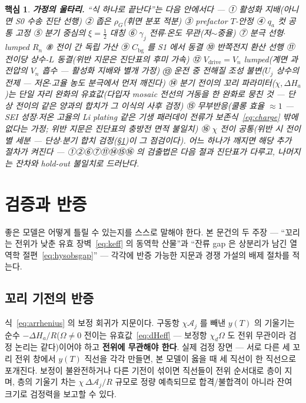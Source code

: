 \documentclass[11pt,a4paper]{article}
\newtheorem*{keybox}{핵심}
\newcommand{\drive}{\mathrm{drive}}
\newcommand{\bg}{\mathrm{bg}}
\begin{document}
\begin{keybox}
\textbf{가정의 울타리.} ``식 하나로 끝난다''는 다음 안에서다 — ① 활성화 지배(아니면 S0 수송 진단 선행)
② 좁은 $\rho_G$(휘면 분포 적분) ③ prefactor $T$-안정 ④ $q_a$ 컷 공통 고정 ⑤ 분기 중심의
$\xi=\tfrac12$ 대칭 ⑥ $\gamma_j$ 전류$\cdot$온도 무관(저$\sim$중율) ⑦ 분극 선형$\cdot$lumped
$R_n$ ⑧ 전이 간 독립 가산 ⑨ $C_\bg$ 를 S1 에서 동결 ⑩ 반쪽전지 환산 선행 ⑪ 전이당 상수-$L$
동결(위반 지문은 진단표의 후미 가속) ⑫ $V_\drive=V_n$ lumped(계면 과전압의 $V_n$ 흡수 — 활성화
지배와 별개 가정) ⑬ 운전 중 전해질 조성 불변($U_j$ 상수의 전제 — 저온$\cdot$고율 농도 분극에서 먼저
깨진다) ⑭ 분기 전이의 꼬리 파라미터($\chi,\Delta H_a$)는 단일 자리 완화의 \emph{유효값}(다입자
mosaic 전선의 거동을 한 완화로 뭉친 것 — 단상 전이의 같은 양과의 합치가 그 이식의 사후 검정)
⑮ 무부반응(쿨롱 효율 $\approx1$ — SEI 성장$\cdot$저온 고율의 Li plating 같은 기생 패러데이 전류가
보존식~\eqref{eq:charge} 밖에 없다는 가정; 위반 지문은 진단표의 충방전 면적 불일치)
⑯ $\chi$ 전이 공통(위반 시 전이별 세분 — 단상$\cdot$분기 합치 검정(\S\ref{sec:falsify})이 그
점검이다). 어느 하나가 깨지면 해당 추가 절차가 켜진다 — ①②⑥⑦⑪⑭⑮⑯ 의 검출법은 다음 절과
진단표가 다루고, 나머지는 잔차와 hold-out 불일치로 드러난다.
\end{keybox}

\section{검증과 반증}\label{sec:falsify}
좋은 모델은 어떻게 틀릴 수 있는지를 스스로 말해야 한다. 본 문건의 두 주장 — ``꼬리는 전위가 낮춘 유효 장벽~\eqref{eq:keff} 의 동역학 산물''과
``잔류 gap 은 상분리가 남긴 열역학 절편~\eqref{eq:hysobsgap}'' — 각각에 반증 가능한 지문과 경쟁
가설의 배제 절차를 적는다.

\subsection{꼬리 기전의 반증}
식~\eqref{eq:arrhenius} 의 보정 회귀가 지문이다. 구동항 $\chi\mathcal A_j$ 를 빼낸 $y(T)$ 의 기울기는
순수 $-\Delta H_a/R$($\Omega\ne0$ 전이는 유효값~\eqref{eq:dHeff} — 보정항 $\chi_d\Omega$ 도
전위 무관이라 검정 논리는 같다)이어야 하고 \textbf{전위에 무관해야 한다}. 실제 검정 장면 — 서로 다른 세 꼬리 전위
창에서 $y(T)$ 직선을 각각 만들면, 본 모델이 옳을 때 세 직선이 한 직선으로 포개진다. 보정이 불완전하거나
다른 기전이 섞이면 직선들이 전위 순서대로 층이 지며, 층의 기울기 차는 $\chi\,\Delta\mathcal A_j/R$
규모로 정량 예측되므로 합격/불합격이 아니라 잔여 크기로 검정력을 보고할 수 있다.
\end{document}
